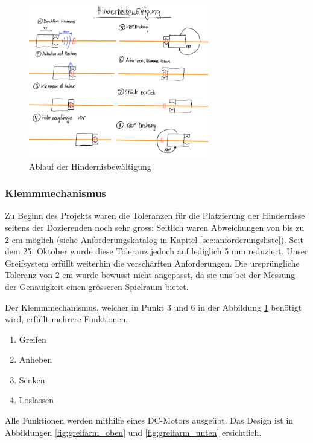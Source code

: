 \documentclass[../main.tex]{subfiles}
\begin{document}
\begin{figure}[H]
\centering
\includegraphics[width=0.7\textwidth]{img/lösungskonzpet/Skizzen/Skizze_Hindernisbewältigung.png}
\caption{Ablauf der Hindernisbewältigung}
\label{img:Skizze_Hindernisbewältigung}
\end{figure}


\subsubsection{Klemmmechanismus}

Zu Beginn des Projekts waren die Toleranzen für die Platzierung der Hindernisse seitens der Dozierenden noch sehr gross: Seitlich waren Abweichungen von bis zu 2 cm möglich (siehe Anforderungskatalog in Kapitel \ref{sec:anforderungsliste}). Seit dem 25. Oktober wurde diese Toleranz jedoch auf lediglich 5 mm reduziert. Unser Greifsystem erfüllt weiterhin die verschärften Anforderungen. Die ursprüngliche Toleranz von 2 cm wurde bewusst nicht angepasst, da sie uns bei der Messung der Genauigkeit einen grösseren Spielraum bietet.

Der Klemmmechanismus, welcher in Punkt 3 und 6 in der Abbildung \ref{img:Skizze_Hindernisbewältigung} benötigt wird, erfüllt mehrere Funktionen.

\begin{enumerate}
    \item Greifen
    \item Anheben
    \item Senken
    \item Loslassen
\end{enumerate}

Alle Funktionen werden mithilfe eines DC-Motors ausgeübt. Das Design ist in Abbildungen \ref{fig:greifarm_oben} und \ref{fig:greifarm_unten} ersichtlich.
\newline
\end{document}

